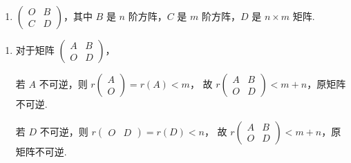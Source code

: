 \begin{exercise}
\begin{exgroup}
\begin{enumerate}
                \item $\begin{pmatrix}
                        O & B \\ C & D
                    \end{pmatrix}$，其中 $B$ 是 $n$ 阶方阵，$C$ 是 $m$ 阶方阵，$D$ 是 $n \times m$ 矩阵.
            \end{enumerate}
        \begin{answer}
            \begin{enumerate}
                \item 对于矩阵 $\begin{pmatrix}
                        A & B \\ O & D
                    \end{pmatrix}$，

                    若 $A$ 不可逆，则 $r\begin{pmatrix} A \\ O \end{pmatrix} = r(A) < m$，
                    故 $r\begin{pmatrix} A & B \\ O & D \end{pmatrix} < m+n$，原矩阵不可逆.

                    若 $D$ 不可逆，则 $r\begin{pmatrix} O & D \end{pmatrix} = r(D) < n$，
                    故 $r\begin{pmatrix} A & B \\ O & D \end{pmatrix} < m+n$，原矩阵不可逆.


\end{enumerate}
\end{answer}
\end{exgroup}
\end{exercise}
